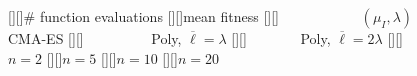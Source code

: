 \documentclass[10pt]{article}\usepackage{graphicx,psfrag}\usepackage{amsmath}
\begin{document}
\thispagestyle{empty}\begin{figure}
[][]{\small \# function evaluations}
[][]{\small mean fitness}
[][]{\small ~~~~~~~~~~~ $(\mu_I,\lambda)$CMA-ES}
[][]{\small ~~~~~~~~~ Poly, $\overline{\ell}=\lambda$}
[][]{\small ~~~~~~~ Poly, $\overline{\ell}=2\lambda$}
[][]{\small $n=2$}
[][]{\small $n=5$}
[][]{\small $n=10$}
[][]{\small $n=20$}
\end{figure}
\end{document}
